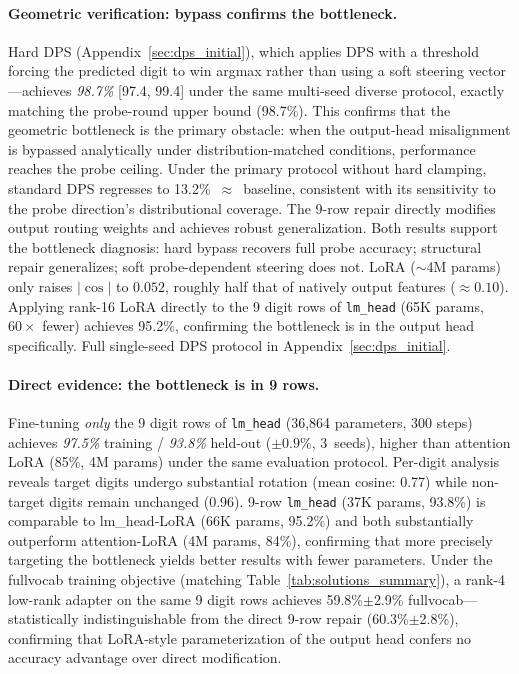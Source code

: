 \documentclass{article}
\begin{document}
\paragraph{Geometric verification: bypass confirms the bottleneck.}
Hard DPS (Appendix~\ref{sec:dps_initial}), which applies DPS with a threshold forcing the predicted digit to win argmax rather than using a soft steering vector---achieves \emph{98.7\%} [97.4, 99.4] under the same multi-seed diverse protocol, exactly matching the probe-round upper bound (98.7\%). This confirms that the geometric bottleneck is the primary obstacle: when the output-head misalignment is bypassed analytically under distribution-matched conditions, performance reaches the probe ceiling.
Under the primary protocol without hard clamping, standard DPS regresses to 13.2\%~$\approx$~baseline, consistent with its sensitivity to the probe direction's distributional coverage. The 9-row repair directly modifies output routing weights and achieves robust generalization. Both results support the bottleneck diagnosis: hard bypass recovers full probe accuracy; structural repair generalizes; soft probe-dependent steering does not.
LoRA ($\sim$4M params) only raises $|\cos|$ to $0.052$, roughly half that of natively output features ($\approx 0.10$). Applying rank-16 LoRA directly to the 9 digit rows of \texttt{lm\_head} (65K params, $60\times$ fewer) achieves 95.2\%, confirming the bottleneck is in the output head specifically.
Full single-seed DPS protocol in Appendix~\ref{sec:dps_initial}.

\paragraph{Direct evidence: the bottleneck is in 9 rows.}
Fine-tuning \emph{only} the 9 digit rows of \texttt{lm\_head}
(36{,}864 parameters, 300 steps) achieves \emph{97.5\%} training / \emph{93.8\%} held-out
($\pm 0.9\%$, 3~seeds), higher than attention LoRA (85\%, 4M params) under the same evaluation protocol.
Per-digit analysis reveals target digits undergo substantial rotation
(mean cosine: 0.77) while non-target digits remain unchanged (0.96).
9-row \texttt{lm\_head} (37K params, 93.8\%) is comparable to lm\_head-LoRA (66K params, 95.2\%) and both substantially outperform attention-LoRA
(4M params, 84\%), confirming that more precisely targeting the bottleneck
yields better results with fewer parameters.
Under the fullvocab training objective (matching Table~\ref{tab:solutions_summary}), a rank-4 low-rank adapter on the same 9 digit rows achieves 59.8\%$\pm$2.9\% fullvocab---statistically indistinguishable from the direct 9-row repair (60.3\%$\pm$2.8\%), confirming that LoRA-style parameterization of the output head confers no accuracy advantage over direct modification.
\end{document}
